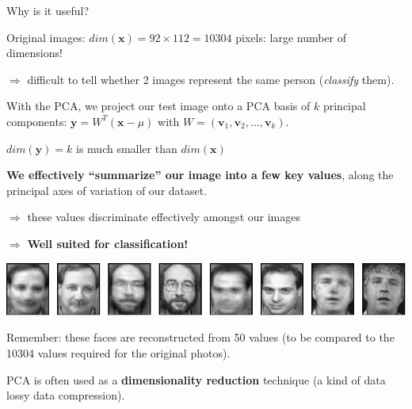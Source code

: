 \documentclass[compress]{beamer}
\begin{document}

\begin{frame}{Why is it useful?}


    Original images: $dim(\mathbf{x}) = 92 \times 112 = 10304$ pixels: large number of dimensions!

    $\Rightarrow$ difficult to tell whether 2 images represent the same person
    (\ie \emph{classify} them).

    \pause

    With the PCA, we project our test image onto a PCA basis of $k$ principal
    components: $\mathbf{y} = W^{T} (\mathbf{x} - \mu)$ with $W = (\mathbf{v}_{1}, \mathbf{v}_{2}, \ldots, \mathbf{v}_{k})$.


    $dim(\mathbf{y}) = k$ is much smaller than $dim(\mathbf{x})$

    \pause

    \textbf{We effectively ``summarize'' our image into a few key values}, along
    the principal axes of variation of our dataset.

    $\Rightarrow$ these values discriminate effectively amongst our images
    
    $\Rightarrow$ \textbf{Well suited for classification!}

\end{frame}


\begin{frame}{}
    \begin{center}
        \includegraphics[width=\linewidth]{reconstruction-50-eigenfaces-top-row}

        \vspace{2em}
        Remember: these faces are reconstructed from 50 values (to be compared
        to the 10304 values required for the original photos).

        \vspace{2em}

        \pause

        PCA is often used as a \textbf{dimensionality reduction} technique (\ie a
        kind of data lossy data compression).

    \end{center}
\end{frame}
\end{document}
